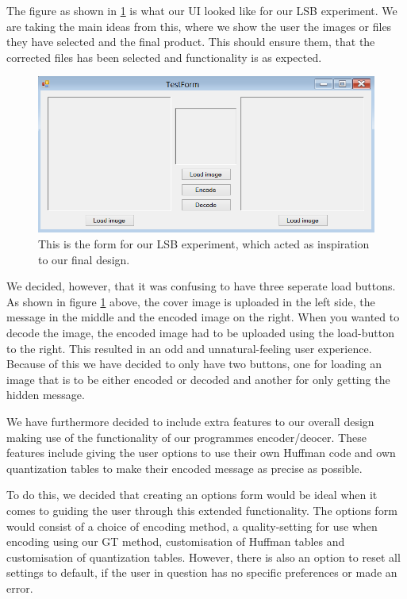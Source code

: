 The figure as shown in \ref{fig:LSBForm} is what our UI looked like for our LSB experiment.
We are taking the main ideas from this, where we show the user the images or files they have selected and the final product. This should ensure them, that the corrected files has been selected and functionality is as expected.
\begin{figure}
	\centering
	\includegraphics[width=1\textwidth]{figures/LSBForm.png}
	\caption{This is the form for our LSB experiment, which acted as inspiration to our final design.}
	\label{fig:LSBForm}
\end{figure}
We decided, however, that it was confusing to have three seperate load buttons.
As shown in figure \ref{fig:LSBForm} above, the cover image is uploaded in the left side, the message in the middle and the encoded image on the right.
When you wanted to decode the image, the encoded image had to be uploaded using the load-button to the right. This resulted in an odd and unnatural-feeling user experience.
Because of this we have decided to only have two buttons, one for loading an image that is to be either encoded or decoded and another for only getting the hidden message.

We have furthermore decided to include extra features to our overall design making use of the functionality of our programmes encoder/deocer.
These features include giving the user options to use their own Huffman code and own quantization tables to make their encoded message as precise as possible.

To do this, we decided that creating an options form would be ideal when it comes to guiding the user through this extended functionality.
The options form would consist of a choice of encoding method, a quality-setting for use when encoding using our GT method, customisation of Huffman tables and customisation of quantization tables.
However, there is also an option to reset all settings to default, if the user in question has no specific preferences or made an error.

